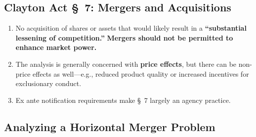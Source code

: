 \subsection{Clayton Act \S\ 7: Mergers and Acquisitions}

\begin{enumerate}
    \item No acquisition of shares or assets that would likely result in a 
    \textbf{``substantial lessening of competition.''} \textbf{Mergers should 
    not be permitted to enhance market power.}
    \item The analysis is generally concerned with \textbf{price effects}, 
    but there can be non-price effects as well---e.g., reduced product 
    quality or increased incentives for exclusionary conduct.
    \item Ex ante notification requirements make \S\ 7 largely an agency 
    practice.
\end{enumerate}

\subsection{Analyzing a Horizontal Merger Problem}

